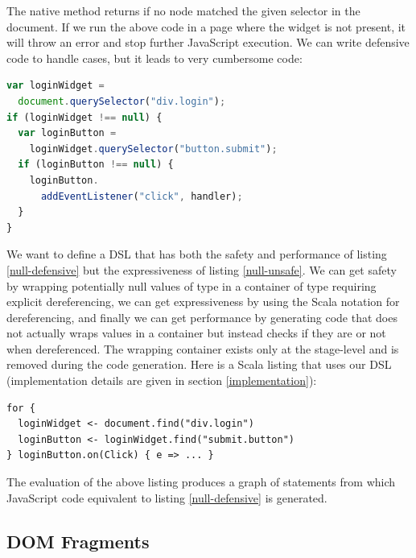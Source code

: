 \documentclass[preprint]{sigplanconf}
\begin{document}
The native  method returns  if no node matched the given selector in the document. If
we run the above code in a page where the widget is not present, it will throw an error and stop further JavaScript
execution. We can write defensive code to handle  cases, but it leads to very cumbersome code:

\begin{lstlisting}[language=JavaScript,label=null-defensive,caption=Defensive programming to handle null references]
var loginWidget =
  document.querySelector("div.login");
if (loginWidget !== null) {
  var loginButton =
    loginWidget.querySelector("button.submit");
  if (loginButton !== null) {
    loginButton.
      addEventListener("click", handler);
  }
}
\end{lstlisting}

We want to define a DSL that has both the safety and performance of listing \ref{null-defensive} but the
expressiveness of listing \ref{null-unsafe}. We can get safety by wrapping potentially null values of type
 in a container of type  requiring explicit dereferencing, we can get
expressiveness by using the Scala  notation for dereferencing, and finally we can get performance by
generating code that does not actually wraps values in a container but instead checks if they are  or not
when dereferenced. The wrapping container exists only at the stage-level and is removed during the code generation.
Here is a Scala listing that uses our DSL (implementation details are given in section \ref{implementation}):

\begin{lstlisting}
for {
  loginWidget <- document.find("div.login")
  loginButton <- loginWidget.find("submit.button")
} loginButton.on(Click) { e => ... }
\end{lstlisting}

The evaluation of the above listing produces a graph of statements from which JavaScript code equivalent to
listing \ref{null-defensive} is generated.

\subsection{DOM Fragments}
\end{document}
